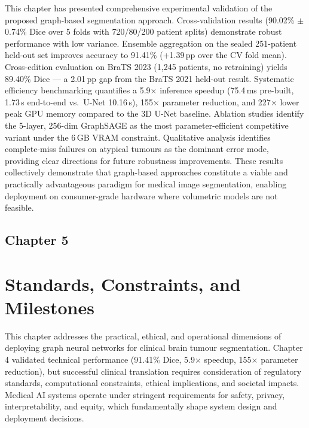 \documentclass{article}
\begin{document}
This chapter has presented comprehensive experimental validation of the proposed graph-based segmentation approach. Cross-validation results (90.02\% $\pm$ 0.74\% Dice over 5 folds with 720/80/200 patient splits) demonstrate robust performance with low variance. Ensemble aggregation on the sealed 251-patient held-out set improves accuracy to 91.41\% (+1.39\,pp over the CV fold mean). Cross-edition evaluation on BraTS 2023 (1,245 patients, no retraining) yields 89.40\% Dice — a 2.01\,pp gap from the BraTS 2021 held-out result. Systematic efficiency benchmarking quantifies a 5.9$\times$ inference speedup (75.4\,ms pre-built, 1.73\,s end-to-end vs.\ U-Net 10.16\,s), 155$\times$ parameter reduction, and 227$\times$ lower peak GPU memory compared to the 3D U-Net baseline. Ablation studies identify the 5-layer, 256-dim GraphSAGE as the most parameter-efficient competitive variant under the 6\,GB VRAM constraint. Qualitative analysis identifies complete-miss failures on atypical tumours as the dominant error mode, providing clear directions for future robustness improvements. These results collectively demonstrate that graph-based approaches constitute a viable and practically advantageous paradigm for medical image segmentation, enabling deployment on consumer-grade hardware where volumetric models are not feasible.

\clearpage
\cleardoublepage
\begin{center}
    \section*{\fontsize{20}{20}\selectfont Chapter 5}
\end{center}
\vspace{10mm}

\section{Standards, Constraints, and Milestones}

This chapter addresses the practical, ethical, and operational dimensions of deploying graph neural networks for clinical brain tumour segmentation. Chapter 4 validated technical performance (91.41\% Dice, 5.9$\times$ speedup, 155$\times$ parameter reduction), but successful clinical translation requires consideration of regulatory standards, computational constraints, ethical implications, and societal impacts. Medical AI systems operate under stringent requirements for safety, privacy, interpretability, and equity, which fundamentally shape system design and deployment decisions.
\end{document}
